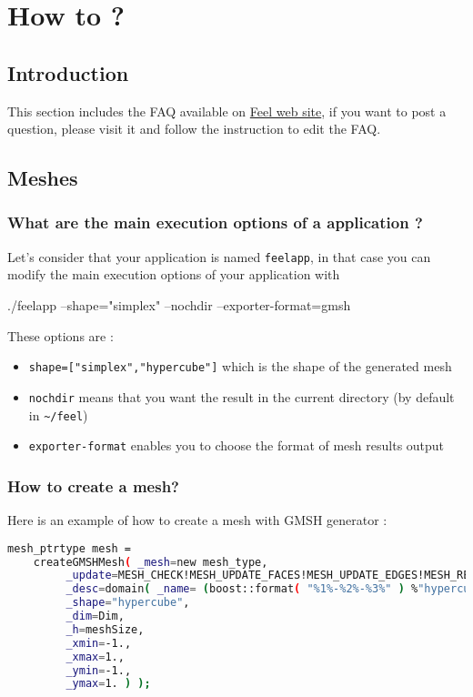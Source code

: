 \chapter{How to ?}
\label{sec:faq}

\section{Introduction}
\label{faq:intro}

This section includes the FAQ available on \href{https://trac.feelpp.org/wiki/FAQ}{Feel web site}, if you want to post a question, please visit it and follow the instruction to edit the FAQ.

\section{Meshes}
\label{faq:meshes}

\subsection{What are the main execution options of a \feel application ?}
Let's consider that your application is named \lstinline!feelapp!, in that case you can modify the main execution options of your application with
\begin{unixcom}
		./feelapp --shape="simplex" --nochdir --exporter-format=gmsh
\end{unixcom}
These options are :
\begin{itemize}
\item \lstinline!shape=["simplex","hypercube"]! which is the shape of the generated mesh
\item \lstinline!nochdir! means that you want the result in the current directory (by default in \lstinline!~/feel!)
\item \lstinline!exporter-format! enables you to choose the format of mesh results output
\end{itemize}

\subsection{How to create a mesh?}
Here is an example of how to create a mesh with GMSH generator :

\begin{lstlisting}[language=sh]
 mesh_ptrtype mesh =
	createGMSHMesh( _mesh=new mesh_type,
         _update=MESH_CHECK!MESH_UPDATE_FACES!MESH_UPDATE_EDGES!MESH_RENUMBER,
         _desc=domain( _name= (boost::format( "%1%-%2%-%3%" ) %"hypercube" %Dim %1).str(),
         _shape="hypercube",
         _dim=Dim,
         _h=meshSize,
         _xmin=-1.,
         _xmax=1.,
         _ymin=-1.,
         _ymax=1. ) );
\end{lstlisting}

